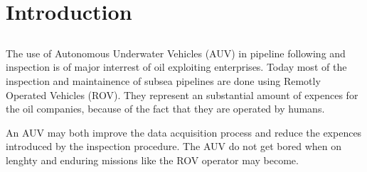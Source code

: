 \chapter{Introduction}

\section{}
	The use of Autonomous Underwater Vehicles (AUV) in pipeline following and inspection is of major interrest of oil exploiting enterprises. Today most of the inspection and maintainence of subsea pipelines are done using Remotly Operated Vehicles (ROV). They represent an substantial amount of expences for the oil companies, because of the fact that they are operated by humans. 
	
	An AUV may both improve the data acquisition process and reduce the expences introduced by the inspection procedure. The AUV do not get bored when on lenghty and enduring missions like the ROV operator may become. 
	
	